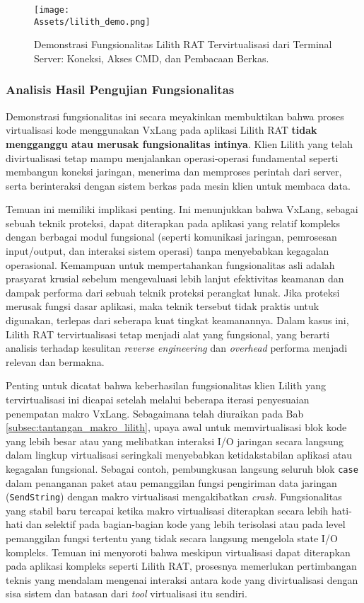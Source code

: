 \begin{figure}[H]
    \centering
    \texttt{[image: \\Assets/lilith\_demo.png]} 
    \caption{Demonstrasi Fungsionalitas Lilith RAT Tervirtualisasi dari Terminal Server: Koneksi, Akses CMD, dan Pembacaan Berkas.}
    \label{fig:lilith_demo_terminal_fungsionalitas}
\end{figure}

\subsubsection{Analisis Hasil Pengujian Fungsionalitas}
Demonstrasi fungsionalitas ini secara meyakinkan membuktikan bahwa proses virtualisasi kode menggunakan VxLang pada aplikasi Lilith RAT \textbf{tidak mengganggu atau merusak fungsionalitas intinya}. Klien Lilith yang telah divirtualisasi tetap mampu menjalankan operasi-operasi fundamental seperti membangun koneksi jaringan, menerima dan memproses perintah dari server, serta berinteraksi dengan sistem berkas pada mesin klien untuk membaca data.

Temuan ini memiliki implikasi penting. Ini menunjukkan bahwa VxLang, sebagai sebuah teknik proteksi, dapat diterapkan pada aplikasi yang relatif kompleks dengan berbagai modul fungsional (seperti komunikasi jaringan, pemrosesan input/output, dan interaksi sistem operasi) tanpa menyebabkan kegagalan operasional. Kemampuan untuk mempertahankan fungsionalitas asli adalah prasyarat krusial sebelum mengevaluasi lebih lanjut efektivitas keamanan dan dampak performa dari sebuah teknik proteksi perangkat lunak. Jika proteksi merusak fungsi dasar aplikasi, maka teknik tersebut tidak praktis untuk digunakan, terlepas dari seberapa kuat tingkat keamanannya. Dalam kasus ini, Lilith RAT tervirtualisasi tetap menjadi alat yang fungsional, yang berarti analisis terhadap kesulitan \textit{reverse engineering} dan \textit{overhead} performa menjadi relevan dan bermakna.

Penting untuk dicatat bahwa keberhasilan fungsionalitas klien Lilith yang tervirtualisasi ini dicapai setelah melalui beberapa iterasi penyesuaian penempatan makro VxLang. Sebagaimana telah diuraikan pada Bab \ref{subsec:tantangan_makro_lilith}, upaya awal untuk memvirtualisasi blok kode yang lebih besar atau yang melibatkan interaksi I/O jaringan secara langsung dalam lingkup virtualisasi seringkali menyebabkan ketidakstabilan aplikasi atau kegagalan fungsional. Sebagai contoh, pembungkusan langsung seluruh blok \texttt{case} dalam penanganan paket atau pemanggilan fungsi pengiriman data jaringan (\texttt{SendString}) dengan makro virtualisasi mengakibatkan \textit{crash}. Fungsionalitas yang stabil baru tercapai ketika makro virtualisasi diterapkan secara lebih hati-hati dan selektif pada bagian-bagian kode yang lebih terisolasi atau pada level pemanggilan fungsi tertentu yang tidak secara langsung mengelola state I/O kompleks. Temuan ini menyoroti bahwa meskipun virtualisasi dapat diterapkan pada aplikasi kompleks seperti Lilith RAT, prosesnya memerlukan pertimbangan teknis yang mendalam mengenai interaksi antara kode yang divirtualisasi dengan sisa sistem dan batasan dari \textit{tool} virtualisasi itu sendiri.

